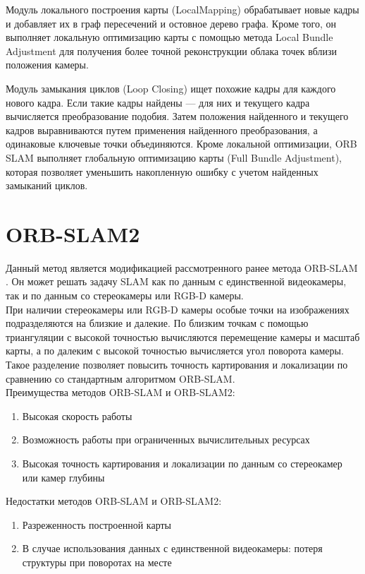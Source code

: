 \documentclass{mipt-thesis-bs}
\begin{document}
Модуль локального построения карты (LocalMapping) обрабатывает новые кадры и добавляет их в граф пересечений и остовное дерево графа. Кроме того, он выполняет локальную оптимизацию карты с помощью метода Local Bundle Adjustment для получения более точной реконструкции облака точек вблизи положения камеры.

Модуль замыкания циклов (Loop Closing) ищет похожие кадры для каждого нового кадра. Если такие кадры найдены — для них и текущего кадра вычисляется преобразование подобия. Затем положения найденного и текущего кадров выравниваются путем применения найденного преобразования, а одинаковые ключевые точки объединяются. Кроме локальной оптимизации, ORB SLAM выполняет глобальную оптимизацию карты (Full Bundle Adjustment), которая позволяет уменьшить накопленную ошибку с учетом найденных замыканий циклов.

\section{ORB-SLAM2}
Данный метод является модификацией рассмотренного ранее метода ORB-SLAM \cite{mur2015orb}. Он может решать задачу SLAM как по данным с единственной видеокамеры, так и по данным со стереокамеры или RGB-D камеры.\\
При наличии стереокамеры или RGB-D камеры особые точки на изображениях подразделяются на близкие и далекие. По близким точкам с помощью триангуляции с высокой точностью вычисляются перемещение камеры и масштаб карты, а по далеким с высокой точностью вычисляется угол поворота камеры. Такое разделение позволяет повысить точность картирования и локализации по сравнению со стандартным алгоритмом ORB-SLAM.\\
Преимущества методов ORB-SLAM и ORB-SLAM2:
\begin{enumerate}
	\item {Высокая скорость работы}
	\item {Возможность работы при ограниченных вычислительных ресурсах}
	\item {Высокая точность картирования и локализации по данным со стереокамер или камер глубины}
\end{enumerate}
Недостатки методов ORB-SLAM и ORB-SLAM2:
\begin{enumerate}
	\item {Разреженность построенной карты}
	\item {В случае использования данных с единственной видеокамеры: потеря структуры при поворотах на месте}
\end{enumerate}
\end{document}
